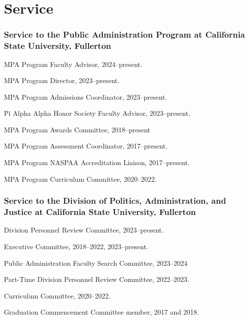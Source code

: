 \documentclass[12pt,letterpaper]{article}
\renewenvironment{itemize}{
  \begin{list}{}{
    \setlength{\leftmargin}{1.5em}
    \setlength{\itemsep}{0.25em}
    \setlength{\parskip}{0pt}
    \setlength{\parsep}{0.25em}
  }
}{
  \end{list}
}
\begin{document}
\section*{Service}

\subsubsection*{Service to the Public Administration Program at California State University, Fullerton}

\begin{itemize}\leftmargin=2pt\itemindent=-15pt\leftmargin=2pt\itemindent=-15pt
    \item MPA Program Faculty Advisor, 2024--present.
    \item MPA Program Director, 2023--present.
    \item MPA Program Admissions Coordinator, 2023--present.
    \item Pi Alpha Alpha Honor Society Faculty Advisor, 2023--present.
    \item MPA Program Awards Committee, 2018--present
    \item MPA Program Assessment Coordinator, 2017--present.
    \item MPA Program NASPAA Accreditation Liaison, 2017--present.
    \item MPA Program Curriculum Committee, 2020--2022.
\end{itemize}

\subsubsection*{Service to the Division of Politics, Administration, and Justice at California State University, Fullerton}
\begin{itemize}\leftmargin=2pt\itemindent=-15pt
    \item Division Personnel Review Committee, 2023--present.
    \item Executive Committee, 2018--2022, 2023--present.
    \item Public Administration Faculty Search Committee, 2023--2024
    \item Part-Time Division Personnel Review Committee, 2022--2023. 
    \item Curriculum Committee, 2020--2022.
    \item Graduation Commencement Committee member, 2017 and 2018. 
\end{itemize}
\end{document}
